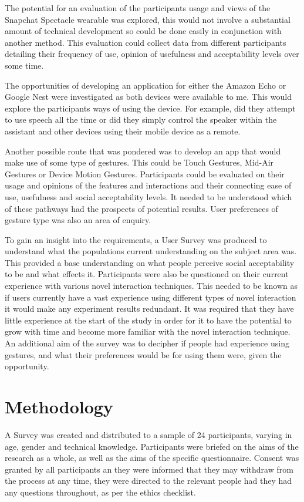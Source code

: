\documentclass{l4proj}
\begin{document}
The potential for an evaluation of the participants usage and views of the Snapchat Spectacle wearable was explored, this would not involve a substantial amount of technical development so could be done easily in conjunction with another method. This evaluation could collect data from different participants detailing their frequency of use, opinion of usefulness and acceptability levels over some time. 

The opportunities of developing an application for either the Amazon Echo or Google Nest were investigated as both devices were available to me. This would explore the participants ways of using the device. For example, did they attempt to use speech all the time or did they simply control the speaker within the assistant and other devices using their mobile device as a remote. 

Another possible route that was pondered was to develop an app that would make use of some type of gestures. This could be Touch Gestures, Mid-Air Gestures or Device Motion Gestures. Participants could be evaluated on their usage and opinions of the features and interactions and their connecting ease of use, usefulness and social acceptability levels. It needed to be understood which of these pathways had the prospects of potential results. User preferences of gesture type was also an area of enquiry.

To gain an insight into the requirements, a User Survey was produced to understand what the populations current understanding on the subject area was. This provided a base understanding on what people perceive social acceptability to be and what effects it. Participants were also be questioned on their current experience with various novel interaction techniques. This needed to be known as if users currently have a vast experience using different types of novel interaction it would make any experiment results redundant. It was required that they have little experience at the start of the study in order for it to have the potential to grow with time and become more familiar with the novel interaction technique. An additional aim of the survey was to decipher if people had experience using gestures, and what their preferences would be for using them were, given the opportunity.

\section{Methodology}

A Survey was created and distributed to a sample of 24 participants, varying in age, gender and technical knowledge. Participants were briefed on the aims of the research as a whole, as well as the aims of the specific questionnaire. Consent was granted by all participants an they were informed that they may withdraw from the process at any time, they were directed to the relevant people had they had any questions throughout, as per the ethics checklist. 
\end{document}
